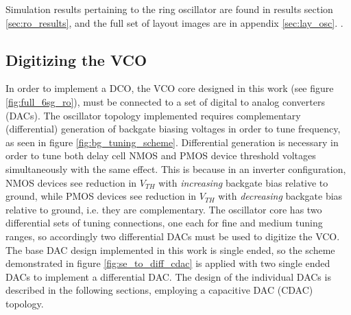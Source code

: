 		Simulation results pertaining to the ring oscillator are found in results section \ref{sec:ro_results}, and the full set of layout images are in appendix \ref{sec:lay_osc}.
\FloatBarrier
{\color{white}.}

	




	\FloatBarrier\pagebreak
	\subsection{Digitizing the VCO}
	In order to implement a DCO, the VCO core designed in this work (see figure \ref{fig:full_6sg_ro}), must be connected to a set of digital to analog converters (DACs). The oscillator topology implemented requires complementary (differential) generation of backgate biasing voltages in order to tune frequency, as seen in figure \ref{fig:bg_tuning_scheme}. Differential generation is necessary in order to tune both delay cell NMOS and PMOS device threshold voltages simultaneously with the same effect. This is because in an inverter configuration, NMOS devices see reduction in $V_{TH}$ with \textit{increasing} backgate bias relative to ground, while PMOS devices see reduction in $V_{TH}$ with \textit{decreasing} backgate bias relative to ground, i.e. they are complementary. The oscillator core has two differential sets of tuning connections, one each for fine and medium tuning ranges, so accordingly two differential DACs must be used to digitize the VCO. The base DAC design implemented in this work is single ended, so the scheme demonstrated in figure \ref{fig:se_to_diff_cdac} is applied with two single ended DACs to implement a differential DAC. The design of the individual DACs is described in the following sections, employing a capacitive DAC (CDAC) topology.
